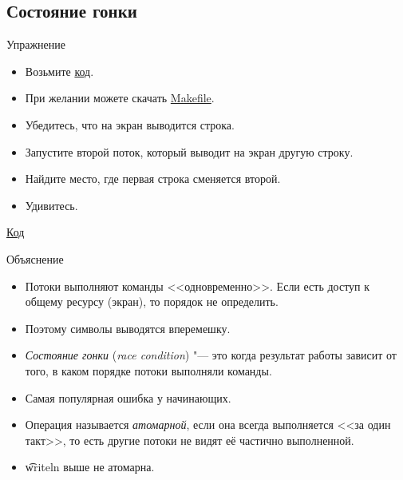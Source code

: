 \subsection{Состояние гонки}

\begin{frame}
\end{frame}

\begin{frame}{Упражнение}
	\begin{itemize}
		\item Возьмите \href{https://github.com/yeputons/fall-2016-paradigms/raw/master/161019/sources/03-writeln-single.c}{код}.
		\item При желании можете скачать \href{https://github.com/yeputons/fall-2016-paradigms/raw/master/161019/sources/Makefile}{Makefile}.
		\item Убедитесь, что на экран выводится строка.
		\item Запустите второй поток, который выводит на экран другую строку.
		\item Найдите место, где первая строка сменяется второй.
		\item Удивитесь.
	\end{itemize}
	\href{https://github.com/yeputons/fall-2016-paradigms/raw/master/161019/sources/04-writeln-race.c}{Код}
\end{frame}

\begin{frame}{Объяснение}
	\begin{itemize}
		\item
			Потоки выполняют команды <<одновременно>>.
			Если есть доступ к общему ресурсу (экран), то порядок не определить.
		\item
			Поэтому символы выводятся вперемешку.
		\item
			\textit{Состояние гонки} (\textit{race condition}) "--- это когда результат работы зависит от того, в каком порядке потоки выполняли команды.
		\item
			Самая популярная ошибка у начинающих.
		\item
			Операция называется \textit{атомарной}, если она всегда выполняется <<за один такт>>,
			то есть другие потоки не видят её частично выполненной.
		\item
			\t{writeln} выше не атомарна.
	\end{itemize}
\end{frame}

